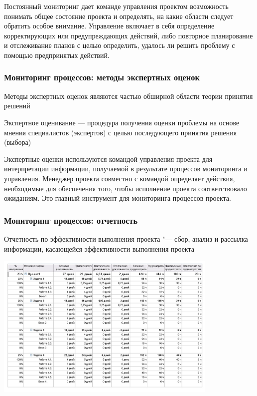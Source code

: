 \documentclass{../industrial-development}
\begin{document}
Постоянный мониторинг дает команде управления проектом возможность понимать общее состояние проекта и определять, на какие области следует обратить особое внимание. Управление включает в себя определение корректирующих или предупреждающих действий, либо повторное планирование и отслеживание планов с целью определить, удалось ли решить проблему с помощью предпринятых действий.

\begin{frame} \frametitle{Мониторинг процессов: методы экспертных оценок}
    Методы экспертных оценок являются частью обширной области теории принятия решений
    \begin{definition}
        \alert{Экспертное оценивание} — процедура получения оценки проблемы на основе мнения специалистов (экспертов) с целью последующего принятия решения (выбора)
    \end{definition}
\end{frame}
\lecturenotes
    
Экспертные оценки используются командой управления проекта для интерпретации информации, получаемой в результате процессов мониторинга и управления. Менеджер проекта совместно с командой определяет действия, необходимые для обеспечения того, чтобы исполнение проекта соответствовало ожиданиям. Это главный инструмент для мониторинга процессов проекта.

\begin{frame} \frametitle{Мониторинг процессов: отчетность}
	\begin{definition}
        \alert{Отчетность по эффективности выполнения проекта} "--- сбор, анализ и рассылка информации, касающейся эффективности выполнения проекта
	\end{definition}
	\centerline{\includegraphics[width=0.8\textwidth]{effect_chart.jpg}}
\end{frame}
\lecturenotes
\end{document}
